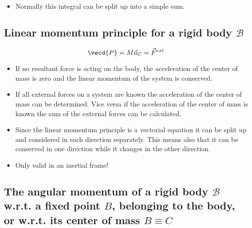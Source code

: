 \documentclass[10pt,a4paper]{scrartcl}
\begin{document}
\begin{multicols*}{2}

\begin{itemize}
\item Normally this integral can be split up into a simple sum.
\end{itemize}

\subsection{Linear momentum principle for a rigid body $\mathcal{B}$}

\begin{equation*}
\vecd{P}=M\vec{a}_C=\vec{F}^{ext}
\end{equation*}


\begin{itemize}
\item If no resultant force is acting on the body, the acceleration of the center of mass is zero and the linear momentum of the system is conserved.
\item If all external forces on a system are known the acceleration of the center of mass can be determined. Vice versa if the acceleration of the center of mass is known the sum of the external forces can be calculated.
\item Since the linear momentum principle is a vectorial equation it can be split up and considered in each direction separately. This means also that it can be conserved in one direction while it changes in the other direction.
\item Only valid in an inertial frame!
\end{itemize}

\subsection{The angular momentum of a rigid body $\mathcal{B}$ w.r.t. a fixed point $B$, belonging to the body, or w.r.t. its center of mass $B\equiv C$}


\end{multicols*}
\end{document}

